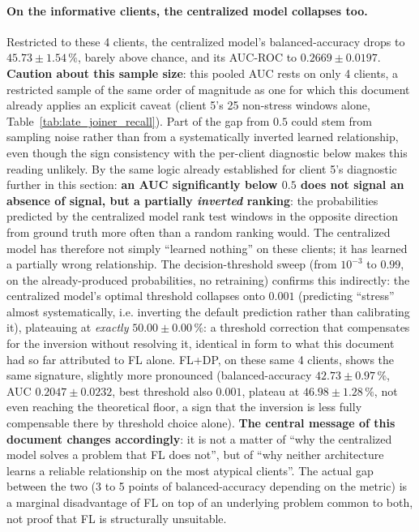 \documentclass{article}
\begin{document}
\paragraph{On the informative clients, the centralized model collapses too.}
Restricted to these 4 clients, the centralized model's balanced-accuracy drops to
$45.73 \pm 1.54\,\%$, barely above chance, and its AUC-ROC to $0.2669 \pm
0.0197$. \textbf{Caution about this sample size}: this pooled AUC rests on only 4
clients, a restricted sample of the same order of magnitude as one for which this
document already applies an explicit caveat (client 5's 25 non-stress windows
alone, Table~\ref{tab:late_joiner_recall}). Part of the gap from $0.5$ could stem
from sampling noise rather than from a systematically inverted learned
relationship, even though the sign consistency with the per-client diagnostic
below makes this reading unlikely. By the same logic already established for
client 5's diagnostic further in this section:
\textbf{an AUC significantly below $0.5$ does not signal an absence of signal,
but a partially \emph{inverted} ranking}: the probabilities predicted by the
centralized model rank test windows in the opposite direction from ground truth
more often than a random ranking would. The centralized model has therefore not
simply ``learned nothing'' on these clients; it has learned a partially wrong
relationship. The decision-threshold sweep (from $10^{-3}$ to $0.99$, on the
already-produced probabilities, no retraining) confirms this indirectly: the
centralized model's optimal threshold collapses onto $0.001$ (predicting
``stress'' almost systematically, i.e. inverting the default prediction rather
than calibrating it), plateauing at \emph{exactly} $50.00 \pm 0.00\,\%$: a
threshold correction that compensates for the inversion without resolving it,
identical in form to what this document had so far attributed to FL alone. FL+DP,
on these same 4 clients, shows the same signature, slightly more pronounced
(balanced-accuracy $42.73 \pm 0.97\,\%$, AUC $0.2047 \pm 0.0232$, best threshold
also $0.001$, plateau at $46.98 \pm 1.28\,\%$, not even reaching the theoretical
floor, a sign that the inversion is less fully compensable there by threshold
choice alone). \textbf{The central message of this document changes
accordingly}: it is not a matter of ``why the centralized model solves a problem
that FL does not'', but of ``why neither architecture learns a reliable
relationship on the most atypical clients''. The actual gap between the two (3
to 5 points of balanced-accuracy depending on the metric) is a marginal
disadvantage of FL on top of an underlying problem common to both, not proof
that FL is structurally unsuitable.
\end{document}
